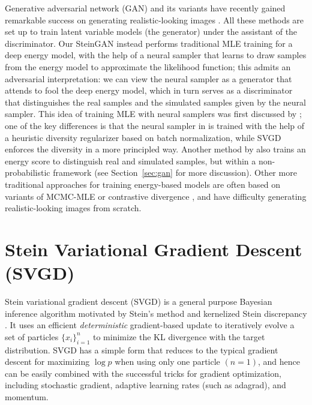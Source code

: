 \documentclass{article} \usepackage{iclr2017_conference,times}
\begin{document}
Generative adversarial network (GAN) and its variants have recently gained remarkable success on generating realistic-looking images 
\citep{goodfellow2014generative, salimans2016improved, radford2015unsupervised, li2015generative,dziugaite2015training,nowozin2016f}.  
All these methods are set up to train latent variable models (the generator) under the assistant of the discriminator.  
Our SteinGAN instead performs traditional MLE training for a deep energy model, 
 with the help of a neural sampler that learns to draw samples from the energy model to approximate the likelihood function; 
 this admits an adversarial interpretation: we can view the neural sampler as a generator that attends to fool the deep energy model, which in turn serves as a discriminator 
that distinguishes the real samples and the simulated samples given by the neural sampler. 
This idea of training MLE with neural samplers was first discussed by \citet{kim2016deep}; 
one of the key differences is that the neural sampler in \citet{kim2016deep} 
is trained with the help of a heuristic diversity regularizer based on batch normalization, while 
SVGD enforces the diversity in a more principled way. 
Another method by \citet{zhao2016energy} also trains an energy score to distinguish real and simulated samples, but within a non-probabilistic framework (see Section~\ref{sec:gan} for more discussion). 
Other more traditional approaches for training energy-based models  \citep[e.g.,][]{ngiam2011learning, xie2016theory} are often based on variants of MCMC-MLE or contrastive divergence \citep{geyer1991markov, hinton2002training, tieleman2008training}, and have difficulty generating realistic-looking images from scratch. 



\section{Stein Variational Gradient Descent (SVGD)}
Stein variational gradient descent (SVGD) \citep{liu2016stein} is a general purpose Bayesian inference algorithm motivated by 
Stein's method \citep{stein1972, barbour2005introduction} and kernelized Stein discrepancy \citep{liu2016kernelized, chwialkowski2016kernel, oates2014control}. 
It uses an efficient \emph{deterministic} gradient-based update 
to iteratively evolve a set of particles $\{x_i\}_{i=1}^n$ to minimize the KL divergence with the target distribution. 
SVGD has a simple form that reduces to the typical gradient descent for maximizing $\log p$ when using only one particle $(n=1)$, 
and hence can be easily combined with the successful tricks for gradient optimization, 
including stochastic gradient, adaptive learning rates (such as adagrad), and momentum. 
\end{document}
